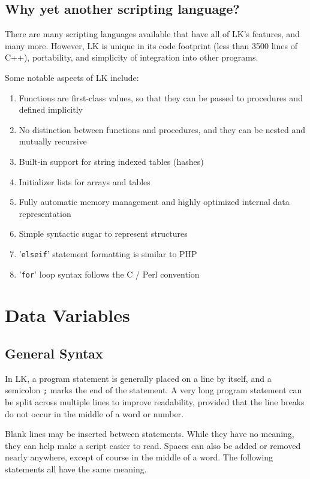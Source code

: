 \documentclass{article}
\begin{document}
\subsection{Why yet another scripting language?}

There are many scripting languages available that have all of LK's features, and many more.  However, LK is unique in its code footprint (less than 3500 lines of C++), portability, and simplicity of integration into other programs.  

Some notable aspects of LK include:
\begin{enumerate}
\item Functions are first-class values, so that they can be passed to procedures and defined implicitly
\item No distinction between functions and procedures, and they can be nested and mutually recursive
\item Built-in support for string indexed tables (hashes)
\item Initializer lists for arrays and tables
\item Fully automatic memory management and highly optimized internal data representation
\item Simple syntactic sugar to represent structures
\item '\texttt{elseif}' statement formatting is similar to PHP
\item '\texttt{for}' loop syntax follows the C / Perl convention
\end{enumerate}

\section{Data Variables}

\subsection{General Syntax}
In LK, a program statement is generally placed on a line by itself, and a semicolon \texttt{;} marks the end of the statement.  A very long program statement can be split across multiple lines to improve readability, provided that the line breaks do not occur in the middle of a word or number.

Blank lines may be inserted between statements.  While they have no meaning, they can help make a script easier to read.  Spaces can also be added or removed nearly anywhere, except of course in the middle of a word.  The following statements all have the same meaning.
\end{document}

